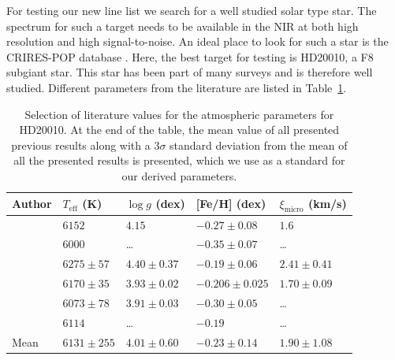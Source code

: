 \documentclass{aa}
\begin{document}
For testing our new line list we search for a well studied solar type star.
The spectrum for such a target
needs to be available in the NIR at both high resolution and high
signal-to-noise. An ideal place to look for such a star is the
CRIRES-POP database \citep{Lebzelter2012}. Here, the best target for
testing is HD20010, a F8 subgiant star. This star has been part of many
surveys and is therefore well studied. Different parameters from the
literature are listed in Table~\ref{tab:parameters}.

\begin{table}[htb!]
    \caption{Selection of literature values for the atmospheric
    parameters for HD20010. At the end of the table, the mean value of
    all presented previous results along with a $3 \sigma$ standard
    deviation from the mean of all the presented results is presented,
    which we use as a standard for our derived parameters.}
    \label{tab:parameters}
    \centering
    \begin{tabular}{l|llll}
      \hline\hline
     Author                 & $T_\mathrm{eff}$ (K) & $\log g$ (dex)  &  [Fe/H] (dex)    & $\xi_\mathrm{micro}$ (km/s)  \\
      \hline
    \cite{Balachandran1990} & $6152$               & $4.15$          & $-0.27\pm0.08$   & $1.6$                        \\
    \cite{Favata1997}       & $6000$               & \ldots          & $-0.35\pm0.07$   & \ldots                       \\
    \cite{Santos2004}       & $6275\pm57$          & $4.40\pm0.37$   & $-0.19\pm0.06$   & $2.41\pm0.41$                \\
    \cite{Gonzalez2010}     & $6170\pm35$          & $3.93\pm0.02$   & $-0.206\pm0.025$ & $1.70\pm0.09$                \\
    \cite{Ramirez2012}      & $6073\pm78$          & $3.91\pm0.03$   & $-0.30\pm0.05$   & \ldots                       \\
    \cite{Mortier2013}      & $6114$               & \ldots          & $-0.19$          & \ldots                       \\
      \hline
      Mean                  & $6131\pm255$         & $4.01\pm0.60$   & $-0.23\pm0.14$   & $1.90\pm1.08$                \\
      \hline
    \end{tabular}
\end{table}
\end{document}
